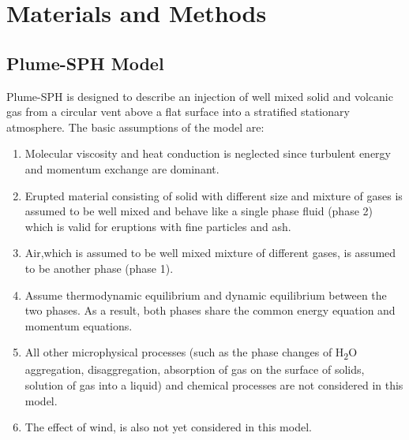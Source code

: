 \documentclass[utf8]{frontiersSCNS} %
\begin{document}
\section{Materials and Methods} \label{sec:Methodology}

\subsection {Plume-SPH Model} \label{sec:plume-sph}
Plume-SPH  \citep{cao2018plume} is designed to describe an injection of well mixed solid and volcanic gas from a circular vent above a flat surface into a stratified stationary atmosphere. The basic assumptions of the model are: 
\begin{enumerate}
\item Molecular viscosity and heat conduction is neglected since turbulent energy and momentum exchange are dominant.
\item Erupted material consisting of solid with different size and mixture of gases is assumed to be well mixed and behave like a single phase fluid (phase 2) which is valid for eruptions with fine particles and ash.
\item Air,which  is assumed to be well mixed mixture of different gases,  is assumed to be another phase (phase 1).
\item Assume thermodynamic equilibrium and dynamic equilibrium between the two phases. As a result, both phases share the common energy equation and momentum equations.
\item All other microphysical processes (such as the phase changes of \texorpdfstring{H\textsubscript{2}O}, aggregation, disaggregation, absorption of gas on the surface of solids, solution of gas into a liquid) and chemical processes are not considered in this model.
\item The effect of wind, is also not yet considered in this model. 
\end{enumerate}
\end{document}
